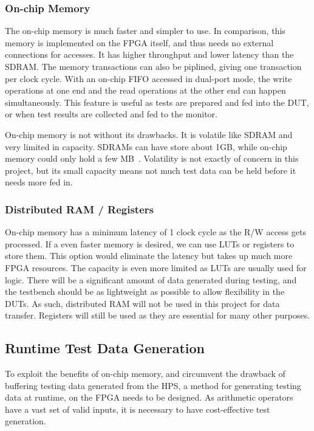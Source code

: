 \subsubsection{\textbf{On-chip Memory}}
The on-chip memory is much faster and simpler to use.
In comparison, this memory is implemented on the FPGA itself, and thus needs
no external connections for accesses.
It has higher throughput and lower latency than the SDRAM.
The memory transactions can also be piplined, giving one transaction per
clock cycle.
With an on-chip FIFO accessed in dual-port mode, the write operations at one
end and the read operations at the other end can happen simultaneously.
This feature is useful as tests are prepared and fed into the DUT, or when test
results are collected and fed to the monitor.

On-chip memory is not without its drawbacks.
It is volatile like SDRAM and very limited in capacity.
SDRAMs can have store about 1GB, while on-chip memory could only hold a few
MB~\cite{Altera2}.
Volatility is not exactly of concern in this project, but its small capacity
means not much test data can be held before it needs more fed in.

\subsubsection{\textbf{Distributed RAM / Registers}}
On-chip memory has a minimum latency of 1 clock cycle as the R/W access gets
processed.
If a even faster memory is desired, we can use LUTs or registers to store them.
This option would eliminate the latency but takes up much more FPGA resources.
The capacity is even more limited as LUTs are usually used for logic.
There will be a significant amount of data generated during testing, and the
testbench should be as lightweight as possible to allow flexibility in the DUTs.
As such, distributed RAM will not be used in this project for data transfer.
Registers will still be used as they are essential for many other purposes.

\subsection{Runtime Test Data Generation}
To exploit the benefits of on-chip memory, and circumvent the drawback of
buffering testing data generated from the HPS, a method for generating testing
data at runtime, on the FPGA needs to be designed.
As arithmetic operators have a vast set of valid inputs, it is necessary to
have cost-effective test generation.

